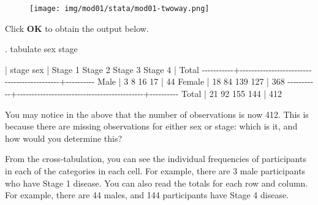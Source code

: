 \documentclass[
  a4paper,
]{memoir}
\newenvironment{Shaded}{\begin{snugshade}}{\end{snugshade}}
\newcommand{\DecValTok}[1]{\textcolor[rgb]{0.00,0.00,0.00}{#1}}
\newcommand{\NormalTok}[1]{\textcolor[rgb]{0.00,0.00,0.00}{#1}}
\newcommand{\SpecialCharTok}[1]{\textcolor[rgb]{0.00,0.00,0.00}{#1}}
\begin{document}
\begin{figure}[H]

{\centering \texttt{[image: img/mod01/stata/mod01-twoway.png]}

}

\end{figure}

Click \textbf{OK} to obtain the output below.

\begin{Shaded}
\begin{Highlighting}[]
\NormalTok{. tabulate sex stage}

           \SpecialCharTok{|}\NormalTok{                    stage}
\NormalTok{       sex }\SpecialCharTok{|}\NormalTok{   Stage }\DecValTok{1}\NormalTok{    Stage }\DecValTok{2}\NormalTok{    Stage }\DecValTok{3}\NormalTok{    Stage }\DecValTok{4} \SpecialCharTok{|}\NormalTok{     Total}
\SpecialCharTok{{-}{-}{-}{-}{-}{-}{-}{-}{-}{-}{-}+{-}{-}{-}{-}{-}{-}{-}{-}{-}{-}{-}{-}{-}{-}{-}{-}{-}{-}{-}{-}{-}{-}{-}{-}{-}{-}{-}{-}{-}{-}{-}{-}{-}{-}{-}{-}{-}{-}{-}{-}{-}{-}{-}{-}+{-}{-}{-}{-}{-}{-}{-}{-}{-}{-}}
\NormalTok{      Male }\SpecialCharTok{|}         \DecValTok{3}          \DecValTok{8}         \DecValTok{16}         \DecValTok{17} \SpecialCharTok{|}        \DecValTok{44} 
\NormalTok{    Female }\SpecialCharTok{|}        \DecValTok{18}         \DecValTok{84}        \DecValTok{139}        \DecValTok{127} \SpecialCharTok{|}       \DecValTok{368} 
\SpecialCharTok{{-}{-}{-}{-}{-}{-}{-}{-}{-}{-}{-}+{-}{-}{-}{-}{-}{-}{-}{-}{-}{-}{-}{-}{-}{-}{-}{-}{-}{-}{-}{-}{-}{-}{-}{-}{-}{-}{-}{-}{-}{-}{-}{-}{-}{-}{-}{-}{-}{-}{-}{-}{-}{-}{-}{-}+{-}{-}{-}{-}{-}{-}{-}{-}{-}{-}}
\NormalTok{     Total }\SpecialCharTok{|}        \DecValTok{21}         \DecValTok{92}        \DecValTok{155}        \DecValTok{144} \SpecialCharTok{|}       \DecValTok{412} 
\end{Highlighting}
\end{Shaded}

You may notice in the above that the number of observations is now 412.
This is because there are missing observations for either sex or stage:
which is it, and how would you determine this?

From the cross-tabulation, you can see the individual frequencies of
participants in each of the categories in each cell. For example, there
are 3 male participants who have Stage 1 disease. You can also read the
totals for each row and column. For example, there are 44 males, and 144
participants have Stage 4 disease.
\end{document}
